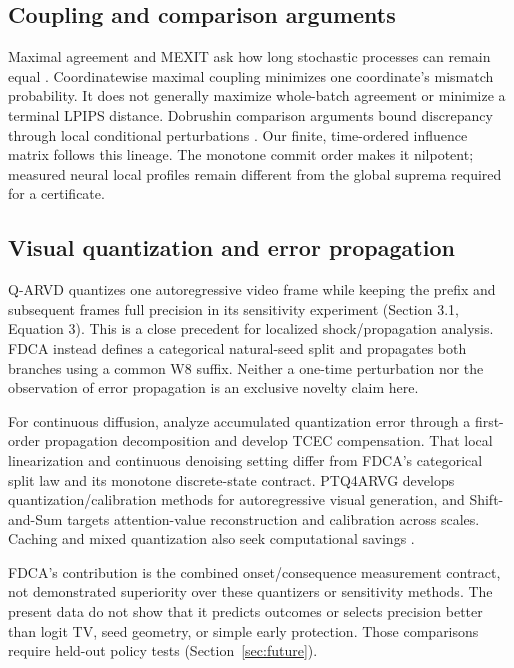 \documentclass[11pt,a4paper]{article}
\theoremstyle{plain}
\theoremstyle{definition}
\theoremstyle{remark}
\begin{document}
\subsection{Coupling and comparison arguments}
Maximal agreement and MEXIT ask how long stochastic processes can remain equal
\citep{vollering2016maximal,ernst2019mexit}.
Coordinatewise maximal coupling minimizes one coordinate's mismatch probability.
It does not generally maximize whole-batch agreement or minimize a terminal
LPIPS distance. Dobrushin comparison arguments bound discrepancy through local
conditional perturbations \citep{rebeschini2014comparison}. Our finite,
time-ordered influence matrix follows this lineage. The monotone commit order
makes it nilpotent; measured neural local profiles remain different from the
global suprema required for a certificate.

\subsection{Visual quantization and error propagation}
Q-ARVD \citep{tang2026qarvd} quantizes one autoregressive video frame
while keeping the prefix and subsequent frames full precision in its sensitivity
experiment (Section 3.1, Equation 3). This is a close precedent for localized
shock/propagation analysis. FDCA instead defines a categorical natural-seed
split and propagates both branches using a common W8 suffix. Neither a
one-time perturbation nor the observation of error propagation is an exclusive
novelty claim here.

For continuous diffusion, \citet{liu2026propagation} analyze accumulated
quantization error through a first-order propagation decomposition and develop
TCEC compensation. That local linearization and continuous denoising setting
differ from FDCA's categorical split law and its monotone discrete-state
contract. PTQ4ARVG \citep{liu2026ptq4arvg} develops quantization/calibration
methods for autoregressive visual generation, and Shift-and-Sum
\citep{moon2026shift} targets attention-value reconstruction and calibration
across scales. Caching and mixed quantization also seek computational savings
\citep{yan2025lazymar,wu2025quantcache}.

FDCA's contribution is the combined onset/consequence measurement contract,
not demonstrated superiority over these quantizers or sensitivity methods.
The present data do not show that it predicts outcomes or selects precision
better than logit TV, seed geometry, or simple early protection. Those comparisons
require held-out policy tests (Section~\ref{sec:future}).
\end{document}

